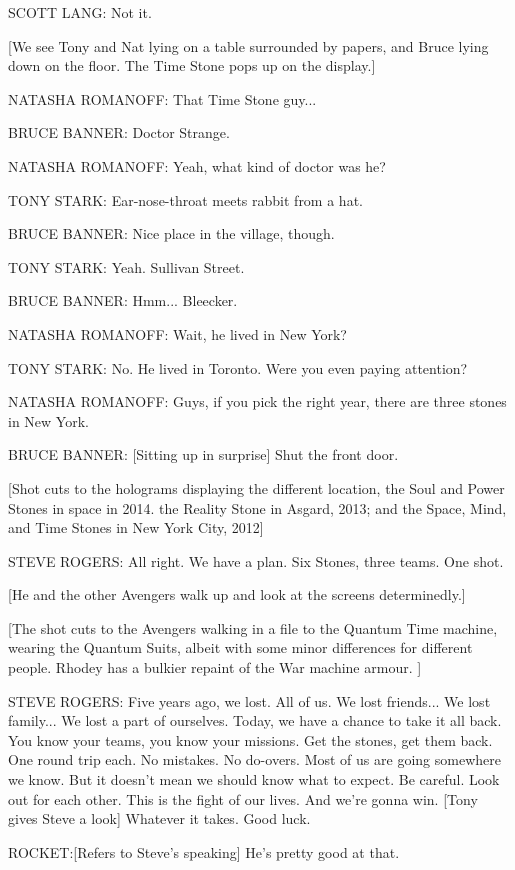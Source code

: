 SCOTT LANG: Not it.

[We see Tony and Nat lying on a table surrounded by papers, and Bruce lying down on the floor. The Time Stone pops up on the display.]

NATASHA ROMANOFF: That Time Stone guy...

BRUCE BANNER: Doctor Strange.

NATASHA ROMANOFF: Yeah, what kind of doctor was he?

TONY STARK: Ear-nose-throat meets rabbit from a hat.

BRUCE BANNER: Nice place in the village, though.

TONY STARK: Yeah. Sullivan Street.

BRUCE BANNER: Hmm... Bleecker.

NATASHA ROMANOFF: Wait, he lived in New York?

TONY STARK: No. He lived in Toronto. Were you even paying attention?

NATASHA ROMANOFF: Guys, if you pick the right year, there are three stones in New York.

BRUCE BANNER: [Sitting up in surprise] Shut the front door.

[Shot cuts to the holograms displaying the different location, the Soul and Power Stones in space in 2014. the Reality Stone in Asgard, 2013; and the Space, Mind, and Time Stones in New York City, 2012]

STEVE ROGERS: All right. We have a plan. Six Stones, three teams. One shot.

[He and the other Avengers walk up and look at the screens determinedly.]

[The shot cuts to the Avengers walking in a file to the Quantum Time machine, wearing the Quantum Suits, albeit with some minor differences for different people. Rhodey has a bulkier repaint of the War machine armour. ]

STEVE ROGERS: Five years ago, we lost. All of us. We lost friends... We lost family... We lost a part of ourselves. Today, we have a chance to take it all back. You know your teams, you know your missions. Get the stones, get them back. One round trip each. No mistakes. No do-overs. Most of us are going somewhere we know. But it doesn't mean we should know what to expect. Be careful. Look out for each other. This is the fight of our lives. And we're gonna win. [Tony gives Steve a look] Whatever it takes. Good luck.

ROCKET:[Refers to Steve's speaking] He's pretty good at that.

